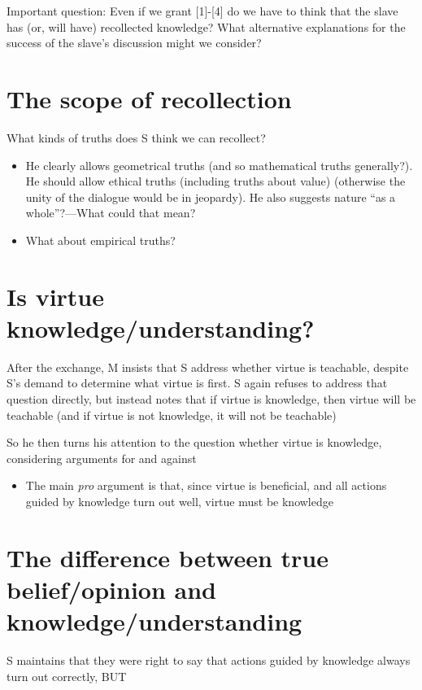 \documentclass[10 pt]{article}
\begin{document}
\noindent Important question: Even if we grant [1]-[4] do we have to think that the slave has (or, will have) recollected knowledge? What alternative explanations for the success of the slave's discussion might we consider?

\section*{The scope of recollection}

\noindent What kinds of truths does S think we can recollect?

\begin{itemize}\item{He clearly allows geometrical truths (and so mathematical truths generally?). He should allow ethical truths (including truths about value) (otherwise the unity of the dialogue would be in jeopardy). He also suggests nature ``as a whole''?---What could that mean?}\item{What about empirical truths?}\end{itemize}

\section*{Is virtue knowledge/understanding?}

After the exchange, M insists that S address whether virtue is teachable, despite S's demand to determine what virtue is first. S again refuses to address that question directly, but instead notes that if virtue is knowledge, then virtue will be teachable (and if virtue is not knowledge, it will not be teachable)

So he then turns his attention to the question whether virtue is knowledge, considering arguments for and against
\begin{itemize}\item{The main \emph{pro} argument is that, since virtue is beneficial, and all actions guided by knowledge turn out well, virtue must be knowledge}\end{itemize}

\section*{The difference between true belief/opinion and knowledge/understanding}

\noindent S maintains that they were right to say that actions guided by knowledge always turn out correctly, BUT
\vspace*{2mm}
\end{document}
